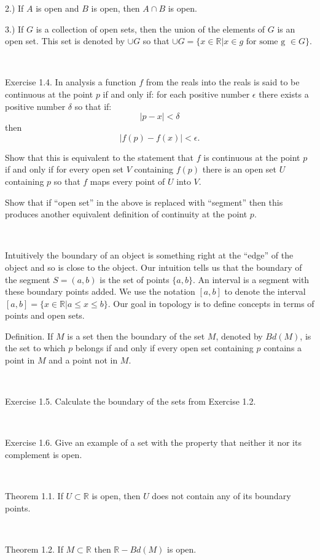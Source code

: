 \documentclass[12pt, std]{article}
\begin{document}
2.) If $A$ is open and $B$ is open, then $A \cap B$ is open.

3.) If $G$ is a collection of open sets, then the union of the
elements of $G$ is an open set.  This set is denoted by $\cup G$ so
that $\cup G = \{ x \in \mathbb{R} | x \in g\textrm{ for some g }\in
G \}$.

\

Exercise 1.4.  In analysis a function $f$ from the reals into the
reals is said to be continuous at the point $p$ if and only if: for
each positive number $\epsilon$ there exists a positive number
$\delta$ so that if: $$|p-x| < \delta$$ then $$|f(p) - f(x)| <
\epsilon.$$

Show that this is equivalent to the statement that $f$ is continuous
at the point $p$ if and only if for every open set $V$ containing
$f(p)$ there is an open set $U$ containing $p$ so that $f$ maps
every point of $U$ into $V$.

Show that if ``open set'' in the above is replaced with ``segment''
then this produces another equivalent definition of continuity at
the point $p$.

\

Intuitively the boundary of an object is something right at the
``edge'' of the object and so is close to the object.  Our intuition
tells us that the boundary of the segment $S =(a,b)$ is the set of points
$\{a, b \}$.  An interval is a segment with these boundary points
added.  We use the notation $[a,b]$ to denote the interval $[a,b] =
\{x \in \mathbb{R} | a \le x \le b \}$.  Our goal in topology is to
define concepts in terms of points and open sets.

Definition.  If $M$ is a set then the boundary of the set $M$,
denoted by $Bd(M)$, is the set to which $p$ belongs if and only if
every open set containing $p$ contains a point in $M$ and a point
not in $M$.

\

Exercise 1.5.  Calculate the boundary of the sets from Exercise 1.2.

\

Exercise 1.6.  Give an example of a set with the property that
neither it nor its complement is open.

\

Theorem 1.1.  If $U \subset \mathbb{R}$ is open, then $U$ does not
contain any of its boundary points.

\

Theorem 1.2.  If $M \subset \mathbb{R}$ then $\mathbb{R} - Bd(M)$ is
open.
\end{document}
